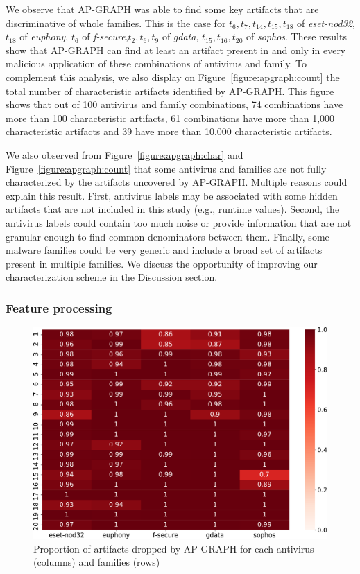 We observe that AP-GRAPH was able to find some key artifacts that are discriminative of whole families.
This is the case for $\mathit{t}_6, \mathit{t}_7, \mathit{t}_{14}, \mathit{t}_{15}, \mathit{t}_{18}$ of \textit{eset-nod32}, $\mathit{t}_{18}$ of \textit{euphony}, $\mathit{t}_6$ of \textit{f-secure},$\mathit{t}_2, \mathit{t}_6, \mathit{t}_9$ of \textit{gdata}, $\mathit{t}_{15}, \mathit{t}_{16}, \mathit{t}_{20}$ of \textit{sophos}.
These results show that AP-GRAPH can find at least an artifact present in and only in every malicious application of these combinations of antivirus and family.
To complement this analysis, we also display on Figure~\ref{figure:apgraph:count} the total number of characteristic artifacts identified by AP-GRAPH.
This figure shows that out of 100 antivirus and family combinations, 74 combinations have more than 100 characteristic artifacts, 61 combinations have more than 1,000 characteristic artifacts and 39 have more than 10,000 characteristic artifacts.

We also observed from Figure~\ref{figure:apgraph:char} and Figure~\ref{figure:apgraph:count} that some antivirus and families are not fully characterized by the artifacts uncovered by AP-GRAPH.
Multiple reasons could explain this result.
First, antivirus labels may be associated with some hidden artifacts that are not included in this study (e.g., runtime values).
Second, the antivirus labels could contain too much noise or provide information that are not granular enough to find common denominators between them.
Finally, some malware families could be very generic and include a broad set of artifacts present in multiple families.
We discuss the opportunity of improving our characterization scheme in the Discussion section.
\subsubsection{Feature processing}

\begin{figure}[!ht]
        \centering
	\includegraphics[width=0.85\linewidth]{figures/apgraph/notselected.pdf}
        \caption[Proportion of artifacts dropped by AP-GRAPH]{Proportion of artifacts dropped by AP-GRAPH for each antivirus (columns) and families (rows)}
	\label{figure:apgraph:notsel}
\end{figure}

